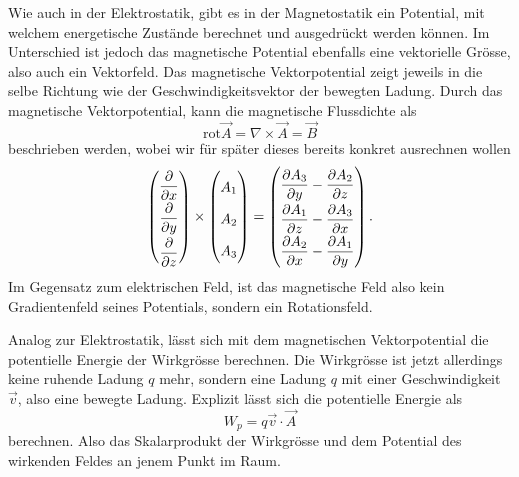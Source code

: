 Wie auch in der Elektrostatik, gibt es in der Magnetostatik ein Potential, mit welchem energetische Zustände berechnet und ausgedrückt werden können. Im Unterschied ist jedoch das magnetische Potential ebenfalls eine vektorielle Grösse, also auch ein Vektorfeld. Das magnetische Vektorpotential zeigt jeweils in die selbe Richtung wie der Geschwindigkeitsvektor der bewegten Ladung.
Durch das magnetische Vektorpotential, kann die magnetische Flussdichte als 
\begin{equation}
	\text{rot}\vec{A}=\nabla \times \vec{A}
	=
	\vec{B}
	\label{maxwell:definitionVektorpot}
\end{equation}
beschrieben werden, wobei wir für später dieses bereits konkret ausrechnen wollen 
\begin{equation}
	\label{maxwell:nablaA}
	\renewcommand{\arraystretch}{1.9}
	\begin{pmatrix}
		\displaystyle
		\frac{\partial}{\partial x} \\
		\displaystyle
		\frac{\partial}{\partial y} \\
		\displaystyle
		\frac{\partial}{\partial z}
	\end{pmatrix}
	\times
	\begin{pmatrix}
		\displaystyle
		A_1 \\
		A_2 \\
		A_3 \\
	\end{pmatrix}
	=
	\begin{pmatrix}
		\displaystyle
		\frac{\partial A_3}{\partial y} -\frac{\partial A_2}{\partial z}\\
		\displaystyle
		\frac{\partial A_1}{\partial z} -\frac{\partial A_3}{\partial x}\\
		\displaystyle
		\frac{\partial A_2}{\partial x} -\frac{\partial A_1}{\partial y}
	\end{pmatrix}.
\end{equation}
Im Gegensatz zum elektrischen Feld, ist das magnetische Feld also kein Gradientenfeld seines Potentials, sondern ein Rotationsfeld.

Analog zur Elektrostatik, lässt sich mit dem magnetischen Vektorpotential die potentielle Energie der Wirkgrösse berechnen. Die Wirkgrösse ist jetzt allerdings keine ruhende Ladung $q$ mehr, sondern eine Ladung $q$ mit einer Geschwindigkeit $\vec{v}$, also eine bewegte Ladung. Explizit lässt sich die potentielle Energie als 
\[ W_p =  q\vec{v}\cdot\vec{A}\]
berechnen. Also das Skalarprodukt der Wirkgrösse und dem Potential des wirkenden Feldes an jenem Punkt im Raum.



